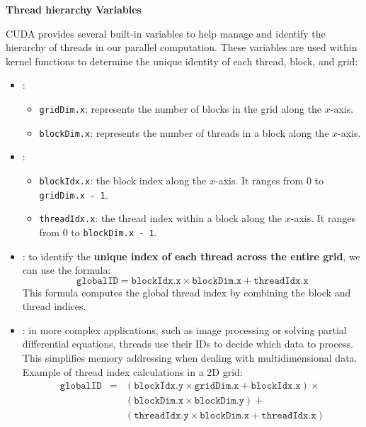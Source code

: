 \highspace
\begin{flushleft}
    \textcolor{Green3}{ \textbf{Thread hierarchy Variables}}
\end{flushleft}
CUDA provides several built-in variables to help manage and identify the hierarchy of threads in our parallel computation. These variables are used within kernel functions to determine the unique identity of each thread, block, and grid:
\begin{itemize}
    \item {}:
    \begin{itemize}
        \item \texttt{gridDim.x}: represents the number of blocks in the grid along the $x$-axis.
        \item \texttt{blockDim.x}: represents the number of threads in a block along the $x$-axis.
    \end{itemize}

    \item {}:
    \begin{itemize}
        \item \texttt{blockIdx.x}: the block index along the $x$-axis. It ranges from 0 to \texttt{gridDim.x - 1}.
        \item \texttt{threadIdx.x}: the thread index within a block along the $x$-axis. It ranges from 0 to \texttt{blockDim.x - 1}.
    \end{itemize}

    \item {}: to identify the \textbf{unique index of each thread across the entire grid}, we can use the formula:
    \begin{equation}
        \texttt{globalID} = \texttt{blockIdx.x} \times \texttt{blockDim.x} + \texttt{threadIdx.x}
    \end{equation}
    This formula computes the global thread index by combining the block and thread indices.

    \item {}: in more complex applications, such as image processing or solving partial differential equations, threads use their IDs to decide which data to process. This simplifies memory addressing when dealing with multidimensional data. Example of thread index calculations in a 2D grid:
    \begin{equation*}
        \begin{array}{rcl}
            \texttt{globalID} &=& \left(\texttt{blockIdx.y} \times \texttt{gridDim.x} + \texttt{blockIdx.x}\right) \times \\ [.3em]
            && \left(\texttt{blockDim.x} \times \texttt{blockDim.y}\right) + \\ [.3em]
            && \left(\texttt{threadIdx.y} \times \texttt{blockDim.x} + \texttt{threadIdx.x}\right)
        \end{array}
    \end{equation*}


\end{itemize}
